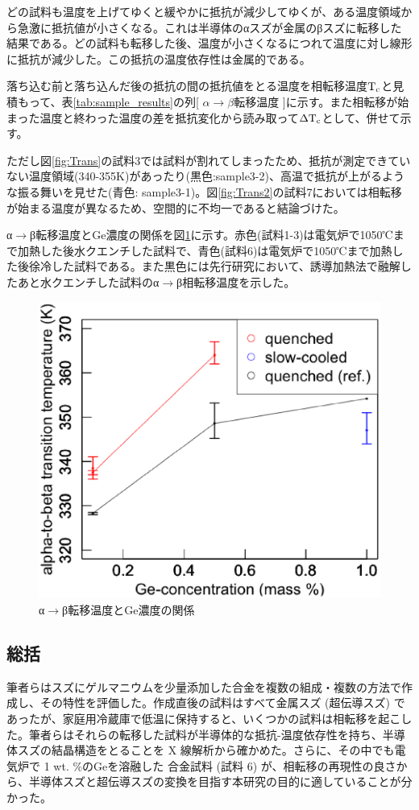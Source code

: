 どの試料も温度を上げてゆくと緩やかに抵抗が減少してゆくが、ある温度領域から急激に抵抗値が小さくなる。これは半導体のαスズが金属のβスズに転移した結果である。どの試料も転移した後、温度が小さくなるにつれて温度に対し線形に抵抗が減少した。この抵抗の温度依存性は金属的である。

落ち込む前と落ち込んだ後の抵抗の間の抵抗値をとる温度を相転移温度$\rm T_c$と見積もって、表\ref{tab:sample_results}の列[ $\alpha\to\beta$転移温度 ]に示す。また相転移が始まった温度と終わった温度の差を抵抗変化から読み取って$\rm \Delta T_c$として、併せて示す。

ただし図\ref{fig:Trans}の試料3では試料が割れてしまったため、抵抗が測定できていない温度領域(340-355K)があったり(黒色:sample3-2)、高温で抵抗が上がるような振る舞いを見せた(青色: sample3-1)。図\ref{fig:Trans2}の試料7においては相転移が始まる温度が異なるため、空間的に不均一であると結論づけた。

α$\to$β転移温度とGe濃度の関係を図\ref{fig:TransitionT}に示す。赤色(試料1-3)は電気炉で1050℃まで加熱した後水クエンチした試料で、青色(試料6)は電気炉で1050℃まで加熱した後徐冷した試料である。また黒色には先行研究\cite{Vnuk1984}において、誘導加熱法で融解したあと水クエンチした試料のα$\to$β相転移温度を示した。
\begin{figure}[!h]
    \begin{center}
   \includegraphics[width=0.6\hsize]{samples/TransitionT.eps}
  \end{center}
  \caption{α$\to$β転移温度とGe濃度の関係}
  \label{fig:TransitionT}
\end{figure}


\subsection{総括}
筆者らはスズにゲルマニウムを少量添加した合金を複数の組成・複数の方法で作成し、その特性を評価した。作成直後の試料はすべて金属スズ (超伝導スズ) であったが、家庭用冷蔵庫で低温に保持すると、いくつかの試料は相転移を起こした。筆者らはそれらの転移した試料が半導体的な抵抗-温度依存性を持ち、半導体スズの結晶構造をとることを X 線解析から確かめた。さらに、その中でも電気炉で 1 wt. \%のGeを溶融した 合金試料 (試料 6) が、相転移の再現性の良さから、半導体スズと超伝導スズの変換を目指す本研究の目的に適していることが分かった。

\clearpage


